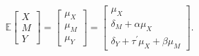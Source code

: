 \begin{equation}
	\label{eq:expected}
	\mathbb{E}
	\left[
	\begin{array}{c}
		{X} \\
		{M} \\
		{Y} 
	\end{array}
	\right]
	=
	\left[
	\begin{array}{c}
		{\mu}_{X} \\
		{\mu}_{M} \\
		{\mu}_{Y} 
	\end{array}
	\right]
	=
	\left[
	\begin{array}{c}
		{\mu}_{X}                  \\
		{\delta}_{M}               
		+ {\alpha}{\mu}_{X}        \\
		{\delta}_{Y}               
		+ {\tau}^{\prime}{\mu}_{X} 
		+ {\beta}{\mu}_{M}         
	\end{array}
	\right] .
\end{equation}

